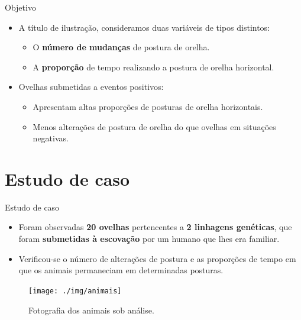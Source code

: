 \documentclass[
  ignorenonframetext,
  serif,
  professionalfont,
  usenames,
  dvipsnames,
  aspectratio = 169]{beamer}
\providecommand{\tightlist}{%
  \setlength{\itemsep}{0pt}\setlength{\parskip}{0pt}}
\renewcommand{\tightlist}{%
  \setlength{\itemsep}{0\baselineskip}
  \setlength{\parskip}{0.25\baselineskip}
}
\def\beginAHalfColumn{\begin{minipage}{0.49\textwidth}}%
\def\beginAThirdColumn{\begin{minipage}{0.31\textwidth}}%
\def\beginTwoThirdsColumn{\begin{minipage}{0.64\textwidth}}%
\def\endColumns{\end{minipage}}%
\begin{document}
\begin{frame}{Objetivo}
\protect\hypertarget{objetivo-2}{}
\beginAHalfColumn

\begin{itemize}
\tightlist
\item
  A título de ilustração, consideramos duas variáveis de tipos
  distintos:

  \begin{itemize}
  \tightlist
  \item
    O \textbf{número de mudanças} de postura de orelha.
  \item
    A \textbf{proporção} de tempo realizando a postura de orelha
    horizontal.
  \end{itemize}
\end{itemize}

\endColumns
\beginAHalfColumn

\begin{itemize}
\tightlist
\item
  Ovelhas submetidas a eventos positivos:

  \begin{itemize}
  \tightlist
  \item
    Apresentam altas proporções de posturas de orelha horizontais.
  \item
    Menos alterações de postura de orelha do que ovelhas em situações
    negativas.
  \end{itemize}
\end{itemize}

\endColumns
\end{frame}

\hypertarget{estudo-de-caso}{%
\section{Estudo de caso}\label{estudo-de-caso}}

\begin{frame}{Estudo de caso}
\protect\hypertarget{estudo-de-caso-1}{}
\beginAThirdColumn

\begin{itemize}
\item
  Foram observadas \textbf{20 ovelhas} pertencentes a
  \textbf{2 linhagens genéticas}, que foram
  \textbf{submetidas à escovação} por um humano que lhes era familiar.
\item
  Verificou-se o número de alterações de postura e as proporções de
  tempo em que os animais permaneciam em determinadas posturas.
\end{itemize}

\endColumns
\beginTwoThirdsColumn

\begin{figure}

{\centering \texttt{[image: ./img/animais]} 

}

\caption{Fotografia dos animais sob análise.}\label{fig:unnamed-chunk-3}
\end{figure}

\endColumns
\end{frame}
\end{document}
